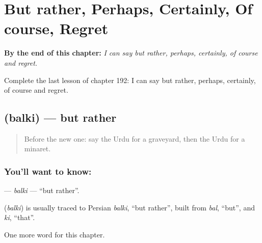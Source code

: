 
\chapter{But rather, Perhaps, Certainly, Of course, Regret}
\label{ch:ur-but-rather-perhaps-certainly-of-course-regret}

\begin{chapteropening}
\textbf{By the end of this chapter:} \emph{I can say but rather, perhaps, certainly, of course and regret.}

Complete the last lesson of chapter 192: I can say but rather, perhaps, certainly, of course and regret.
\end{chapteropening}

\section[\texorpdfstring{\ur{بلکہ} (balki)}{بلکہ (balki)}]{ (balki) — but rather}

\label{lesson:UR-C192-balki}



\begin{quote}
Before the new one: say the Urdu for a graveyard, then the Urdu for a minaret.
\end{quote}

\subsection*{You'll want to know: }
\textbf{} — \emph{balki} — \textquotedblleft{}but rather\textquotedblright{}.

\begin{cousinweb}
\textbf{} (\emph{balki}) is usually traced to Persian \emph{balki}, \textquotedblleft{}but rather\textquotedblright{}, built from \emph{bal}, \textquotedblleft{}but\textquotedblright{}, and \emph{ki}, \textquotedblleft{}that\textquotedblright{}.
\end{cousinweb}

\begin{grammarlens}[title={What you've built}]
One more word for this chapter.
\end{grammarlens}

